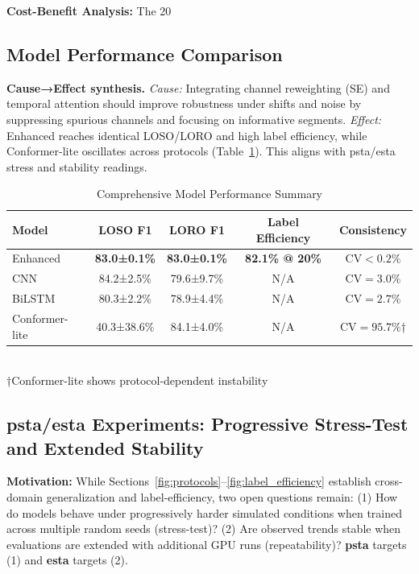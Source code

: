 \documentclass[journal]{IEEEtran}
\begin{document}
\textbf{Cost-Benefit Analysis:} The 20%

\subsection{Model Performance Comparison}

\textbf{Cause→Effect synthesis.} \emph{Cause:} Integrating channel reweighting (SE) and temporal attention should improve robustness under shifts and noise by suppressing spurious channels and focusing on informative segments. \emph{Effect:} Enhanced reaches identical LOSO/LORO and high label efficiency, while Conformer-lite oscillates across protocols (Table~\ref{tab:model_performance}). This aligns with \gls{psta}/\gls{esta} stress and stability readings.

\begin{table}[ht]
\centering
\caption{Comprehensive Model Performance Summary}
\begin{tabular}{@{}lcccc@{}}
\toprule
Model & LOSO F1 & LORO F1 & Label Efficiency & Consistency \\
\midrule
Enhanced & \textbf{83.0±0.1\%} & \textbf{83.0±0.1\%} & \textbf{82.1\% @ 20\%} & \textbf{$\text{CV}<0.2\%$} \\
CNN & 84.2±2.5\% & 79.6±9.7\% & N/A & $\text{CV}=3.0\%$ \\
BiLSTM & 80.3±2.2\% & 78.9±4.4\% & N/A & $\text{CV}=2.7\%$ \\
Conformer-lite & 40.3±38.6\% & 84.1±4.0\% & N/A & $\text{CV}=95.7\%$† \\
\bottomrule
\end{tabular}\\
\footnotesize{†Conformer-lite shows protocol-dependent instability}
\label{tab:model_performance}
\end{table}

\subsection{\gls{psta}/\gls{esta} Experiments: Progressive Stress-Test and Extended Stability}

\textbf{Motivation:} While Sections~\ref{fig:protocols}--\ref{fig:label_efficiency} establish cross-domain generalization and label-efficiency, two open questions remain: (1) How do models behave under progressively harder simulated conditions when trained across multiple random seeds (stress-test)? (2) Are observed trends stable when evaluations are extended with additional GPU runs (repeatability)? \textbf{\gls{psta}} targets (1) and \textbf{\gls{esta}} targets (2).
\end{document}
